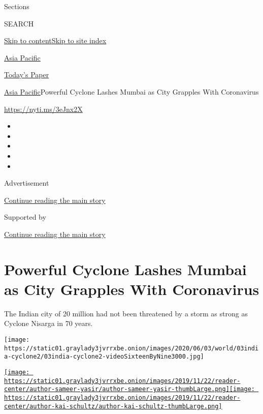 Sections

SEARCH

\protect\hyperlink{site-content}{Skip to
content}\protect\hyperlink{site-index}{Skip to site index}

\href{https://www.nytimes3xbfgragh.onion/section/world/asia}{Asia
Pacific}

\href{https://myaccount.nytimes3xbfgragh.onion/auth/login?response_type=cookie\&client_id=vi}{}

\href{https://www.nytimes3xbfgragh.onion/section/todayspaper}{Today's
Paper}

\href{/section/world/asia}{Asia Pacific}\textbar{}Powerful Cyclone
Lashes Mumbai as City Grapples With Coronavirus

\url{https://nyti.ms/3eJnx2X}

\begin{itemize}
\item
\item
\item
\item
\item
\end{itemize}

Advertisement

\protect\hyperlink{after-top}{Continue reading the main story}

Supported by

\protect\hyperlink{after-sponsor}{Continue reading the main story}

\hypertarget{powerful-cyclone-lashes-mumbai-as-city-grapples-with-coronavirus}{%
\section{Powerful Cyclone Lashes Mumbai as City Grapples With
Coronavirus}\label{powerful-cyclone-lashes-mumbai-as-city-grapples-with-coronavirus}}

The Indian city of 20 million had not been threatened by a storm as
strong as Cyclone Nisarga in 70 years.

\texttt{[image: https://static01.graylady3jvrrxbe.onion/images/2020/06/03/world/03india-cyclone2/03india-cyclone2-videoSixteenByNine3000.jpg]}

\href{https://www.nytimes3xbfgragh.onion/by/sameer-yasir}{\texttt{[image: https://static01.graylady3jvrrxbe.onion/images/2019/11/22/reader-center/author-sameer-yasir/author-sameer-yasir-thumbLarge.png]}}\href{https://www.nytimes3xbfgragh.onion/by/kai-schultz}{\texttt{[image: https://static01.graylady3jvrrxbe.onion/images/2019/11/22/reader-center/author-kai-schultz/author-kai-schultz-thumbLarge.png]}}

